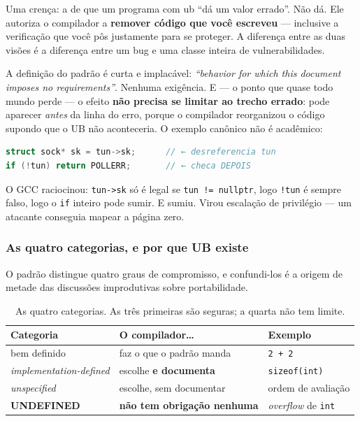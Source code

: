 \begin{porque}
Uma crença: a de que um programa com \gls{ub} ``dá um valor errado''. Não dá. Ele
autoriza o compilador a \textbf{remover código que você escreveu} --- inclusive a
verificação que você pôs justamente para se proteger. A diferença entre as duas
visões é a diferença entre um bug e uma classe inteira de vulnerabilidades.
\end{porque}

A definição do padrão é curta e implacável: \emph{``behavior for which this
document imposes no requirements''}. Nenhuma exigência. E --- o ponto que quase
todo mundo perde --- o efeito \textbf{não precisa se limitar ao trecho errado}:
pode aparecer \emph{antes} da linha do erro, porque o compilador reorganizou o
código supondo que o UB não aconteceria. O exemplo canônico não é acadêmico:

\begin{lstlisting}[style=bt, language=C++,
    caption={O \texttt{tun\_chr\_poll} do kernel Linux --- CVE-2009-1897.}]
struct sock* sk = tun->sk;      // ← desreferencia tun
if (!tun) return POLLERR;       // ← checa DEPOIS
\end{lstlisting}

O GCC raciocinou: \texttt{tun->sk} só é legal se \texttt{tun != nullptr}, logo
\texttt{!tun} é sempre falso, logo o \texttt{if} inteiro pode sumir. E sumiu.
Virou escalação de privilégio --- um atacante conseguia mapear a página zero.

\subsubsection{As quatro categorias, e por que UB existe}

O padrão distingue quatro graus de compromisso, e confundi-los é a origem de
metade das discussões improdutivas sobre portabilidade.

\begin{table}[htbp]
\centering
\caption{As quatro categorias. As três primeiras são seguras; a quarta não tem limite.}
\label{tab:ub-categorias}
\footnotesize
\begin{tabular}{@{}lll@{}}
\toprule
\textbf{Categoria} & \textbf{O compilador\ldots} & \textbf{Exemplo} \\
\midrule
bem definido              & faz o que o padrão manda        & \texttt{2 + 2} \\
\emph{implementation-defined} & escolhe \textbf{e documenta} & \texttt{sizeof(int)} \\
\emph{unspecified}        & escolhe, sem documentar         & ordem de avaliação \\
\textbf{UNDEFINED}        & \textbf{não tem obrigação nenhuma} & \emph{overflow} de \texttt{int} \\
\bottomrule
\end{tabular}
\end{table}

